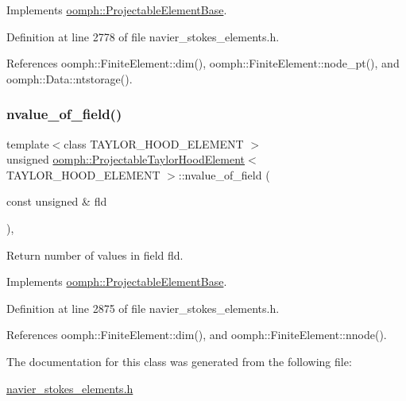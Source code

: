 Implements \hyperlink{classoomph_1_1ProjectableElementBase_ac6790f394630b964663281f8740f43a5}{oomph\+::\+Projectable\+Element\+Base}.



Definition at line 2778 of file navier\+\_\+stokes\+\_\+elements.\+h.



References oomph\+::\+Finite\+Element\+::dim(), oomph\+::\+Finite\+Element\+::node\+\_\+pt(), and oomph\+::\+Data\+::ntstorage().

\mbox{\label{classoomph_1_1ProjectableTaylorHoodElement_acc580c5ee1ce18d7d6b42d67e9323e99}} 
\subsubsection{\texorpdfstring{nvalue\+\_\+of\+\_\+field()}{nvalue\_of\_field()}}
{\footnotesize\ttfamily template$<$class T\+A\+Y\+L\+O\+R\+\_\+\+H\+O\+O\+D\+\_\+\+E\+L\+E\+M\+E\+NT $>$ \\
unsigned \hyperlink{classoomph_1_1ProjectableTaylorHoodElement}{oomph\+::\+Projectable\+Taylor\+Hood\+Element}$<$ T\+A\+Y\+L\+O\+R\+\_\+\+H\+O\+O\+D\+\_\+\+E\+L\+E\+M\+E\+NT $>$\+::nvalue\+\_\+of\+\_\+field (\begin{DoxyParamCaption}\item[{const unsigned \&}]{fld }\end{DoxyParamCaption})\hspace{0.3cm}{\ttfamily [inline]}, {\ttfamily [virtual]}}



Return number of values in field fld. 



Implements \hyperlink{classoomph_1_1ProjectableElementBase_a1a9a6de16f3511bca8e8be770abb9c2e}{oomph\+::\+Projectable\+Element\+Base}.



Definition at line 2875 of file navier\+\_\+stokes\+\_\+elements.\+h.



References oomph\+::\+Finite\+Element\+::dim(), and oomph\+::\+Finite\+Element\+::nnode().



The documentation for this class was generated from the following file\+:\begin{DoxyCompactItemize}
\item 
\hyperlink{navier__stokes__elements_8h}{navier\+\_\+stokes\+\_\+elements.\+h}\end{DoxyCompactItemize}
